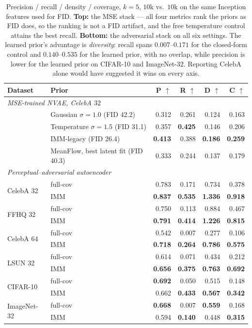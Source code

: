 \documentclass[sigconf,nonacm]{acmart}
\newcommand{\best}[1]{\textbf{#1}}
\begin{document}
\begin{table}[t]
\caption{Precision / recall / density / coverage, $k{=}5$, $10$k vs.\ $10$k on
the same Inception features used for FID. \textbf{Top:} the MSE stack --- all
four metrics rank the priors as FID does, so the ranking is not a FID artifact,
and the free temperature control attains the best recall. \textbf{Bottom:} the
adversarial stack on all six settings. The learned prior's advantage is
\emph{diversity}: recall spans $0.007$--$0.171$ for the closed-form control and
$0.140$--$0.535$ for the learned prior, with no overlap, while precision is
lower for the learned prior on CIFAR-10 and ImageNet-32. Reporting CelebA alone
would have suggested it wins on every axis.}
\label{tab:prdc}
\small
\begin{tabular}{llrrrr}
\toprule
Dataset & Prior & P $\uparrow$ & R $\uparrow$ & D $\uparrow$ & C $\uparrow$ \\
\midrule
\multicolumn{6}{l}{\emph{MSE-trained NVAE, CelebA $32$}}\\
& Gaussian $\sigma{=}1.0$ (FID 42.2)    & 0.312 & 0.261 & 0.124 & 0.163 \\
& Temperature $\sigma{=}1.5$ (FID 31.1) & 0.357 & \best{0.425} & 0.146 & 0.206 \\
& IMM-legacy (FID 26.4)                 & \best{0.413} & 0.388 & \best{0.186} & \best{0.259} \\
& MeanFlow, best latent fit (FID 40.3)  & 0.333 & 0.244 & 0.137 & 0.179 \\
\midrule
\multicolumn{6}{l}{\emph{Perceptual--adversarial autoencoder}}\\
\multirow{2}{*}{CelebA 32}   & full-cov & 0.783 & 0.171 & 0.734 & 0.378 \\
                             & IMM      & \best{0.837} & \best{0.535} & \best{1.336} & \best{0.918} \\
\multirow{2}{*}{FFHQ 32}     & full-cov & 0.750 & 0.113 & 0.884 & 0.467 \\
                             & IMM      & \best{0.791} & \best{0.414} & \best{1.226} & \best{0.815} \\
\multirow{2}{*}{CelebA 64}   & full-cov & 0.542 & 0.007 & 0.277 & 0.106 \\
                             & IMM      & \best{0.718} & \best{0.264} & \best{0.786} & \best{0.575} \\
\multirow{2}{*}{LSUN 32}     & full-cov & 0.614 & 0.071 & 0.434 & 0.212 \\
                             & IMM      & \best{0.656} & \best{0.375} & \best{0.763} & \best{0.692} \\
\multirow{2}{*}{CIFAR-10}    & full-cov & \best{0.692} & 0.050 & 0.515 & 0.148 \\
                             & IMM      & 0.662 & \best{0.433} & \best{0.567} & \best{0.342} \\
\multirow{2}{*}{ImageNet-32} & full-cov & \best{0.668} & 0.007 & \best{0.559} & 0.168 \\
                             & IMM      & 0.594 & \best{0.140} & 0.448 & \best{0.315} \\
\bottomrule
\end{tabular}
\end{table}
\end{document}
